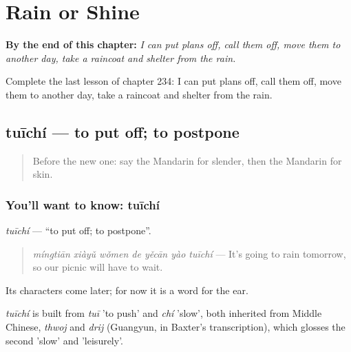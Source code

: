 
\chapter{Rain or Shine}
\label{ch:zh-rain-or-shine}

\begin{chapteropening}
\textbf{By the end of this chapter:} \emph{I can put plans off, call them off, move them to another day, take a raincoat and shelter from the rain.}

Complete the last lesson of chapter 234: I can put plans off, call them off, move them to another day, take a raincoat and shelter from the rain.
\end{chapteropening}

\section[tuīchí]{tuīchí — to put off; to postpone}

\label{lesson:ZH-C234-tuichi}



\begin{quote}
Before the new one: say the Mandarin for slender, then the Mandarin for skin.
\end{quote}

\subsection*{You'll want to know: tuīchí}
\emph{tuīchí} — \textquotedblleft{}to put off; to postpone\textquotedblright{}.

\begin{quote}
\emph{míngtiān xiàyǔ wǒmen de yěcān yào tuīchí} — It's going to rain tomorrow, so our picnic will have to wait.
\end{quote}

Its characters come later; for now it is a word for the ear.

\begin{cousinweb}
\emph{tuīchí} is built from \emph{tuī} 'to push' and \emph{chí} 'slow', both inherited from Middle Chinese, \emph{thwoj} and \emph{drij} (Guangyun, in Baxter's transcription), which glosses the second 'slow' and 'leisurely'.
\end{cousinweb}


